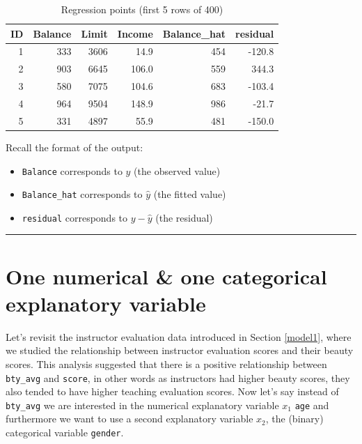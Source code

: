 \documentclass[12pt, krantz2,]{krantz}
\providecommand{\tightlist}{%
  \setlength{\itemsep}{0pt}\setlength{\parskip}{0pt}}
\begin{document}
\begin{table}[H]

\caption{\label{tab:model3-points-table}Regression points (first 5 rows of 400)}
\centering
\fontsize{10}{12}\selectfont
\begin{tabular}{rrrrrr}
\toprule
ID & Balance & Limit & Income & Balance\_hat & residual\\
\midrule
1 & 333 & 3606 & 14.9 & 454 & -120.8\\
2 & 903 & 6645 & 106.0 & 559 & 344.3\\
3 & 580 & 7075 & 104.6 & 683 & -103.4\\
4 & 964 & 9504 & 148.9 & 986 & -21.7\\
5 & 331 & 4897 & 55.9 & 481 & -150.0\\
\bottomrule
\end{tabular}
\end{table}

Recall the format of the output:

\begin{itemize}
\tightlist
\item
  \texttt{Balance} corresponds to \(y\) (the observed value)
\item
  \texttt{Balance\_hat} corresponds to \(\widehat{y}\) (the fitted value)
\item
  \texttt{residual} corresponds to \(y - \widehat{y}\) (the residual)
\end{itemize}

\begin{center}\rule{0.5\linewidth}{\linethickness}\end{center}

\hypertarget{model4}{%
\section{One numerical \& one categorical explanatory variable}\label{model4}}

Let's revisit the instructor evaluation data introduced in Section \ref{model1}, where we studied the relationship between instructor evaluation scores and their beauty scores. This analysis suggested that there is a positive relationship between \texttt{bty\_avg} and \texttt{score}, in other words as instructors had higher beauty scores, they also tended to have higher teaching evaluation scores. Now let's say instead of \texttt{bty\_avg} we are interested in the numerical explanatory variable \(x_1\) \texttt{age} and furthermore we want to use a second explanatory variable \(x_2\), the (binary) categorical variable \texttt{gender}.
\end{document}
